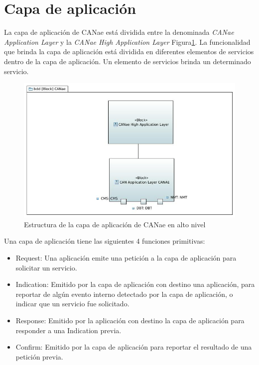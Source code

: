 \section{Capa de aplicación}
La capa de aplicación de CANae está dividida entre la denominada \textit{CANae Application Layer} y la \textit{CANae High Application Layer} Figura\ref{fig:CANAE}. La funcionalidad que brinda la capa de aplicación está dividida en diferentes elementos de servicios dentro de la capa de aplicación. Un elemento de servicios brinda un determinado servicio.

\begin{figure}[h!]
 \centering
 \includegraphics[scale=0.5]{images/Secciones/AppendixA/CANAE.JPG}
  \caption{Estructura de la capa de aplicación de CANae en alto nivel}
\label{fig:CANAE}
\end{figure}

Una capa de aplicación tiene las siguientes 4 funciones primitivas:
\begin{itemize}
\item Request: Una aplicación emite una petición a la capa de aplicación para solicitar un servicio.
  
\item Indication: Emitido por la capa de aplicación con destino una aplicación, para reportar de algún evento interno detectado por la capa de aplicación, o indicar que un servicio fue solicitado.

\item Response: Emitido por la aplicación con destino la capa de aplicación para responder a una Indication previa.

\item Confirm: Emitido por la capa de aplicación para reportar el resultado de una petición previa. 
\end{itemize}

